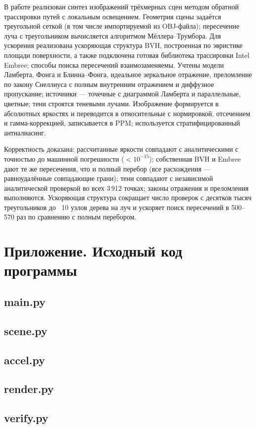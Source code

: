 \documentclass[12pt,a4paper]{article}
\begin{document}
В работе реализован синтез изображений трёхмерных сцен методом обратной трассировки путей с локальным освещением.
Геометрия сцены задаётся треугольной сеткой (в том числе импортируемой из OBJ-файла); пересечение луча с
треугольником вычисляется алгоритмом Мёллера–Трумбора. Для ускорения реализована ускоряющая структура BVH,
построенная по эвристике площади поверхности, а также подключена готовая библиотека трассировки Intel Embree;
способы поиска пересечений взаимозаменяемы. Учтены модели Ламберта, Фонга и Блинна–Фонга, идеальное зеркальное
отражение, преломление по закону Снеллиуса с полным внутренним отражением и диффузное пропускание; источники —
точечные с диаграммой Ламберта и параллельные, цветные; тени строятся теневыми лучами. Изображение формируется в
абсолютных яркостях и переводится в относительные с нормировкой, отсечением и гамма-коррекцией, записывается в PPM;
используется стратифицированный антиалиасинг.

Корректность доказана: рассчитанные яркости совпадают с аналитическими с точностью до машинной погрешности
($<10^{-15}$); собственная BVH и Embree дают те же пересечения, что и полный перебор (все расхождения — равноудалённые
совпадающие грани); тени совпадают с независимой аналитической проверкой во всех 3\,912 точках; законы отражения и
преломления выполняются. Ускоряющая структура сокращает число проверок с десятков тысяч треугольников до ~10 узлов
дерева на луч и ускоряет поиск пересечений в 500–570 раз по сравнению с полным перебором.

\newpage
\appendix
\section*{Приложение. Исходный код программы}

\subsection*{main.py}

\subsection*{scene.py}

\subsection*{accel.py}

\subsection*{render.py}

\subsection*{verify.py}

\end{document}
